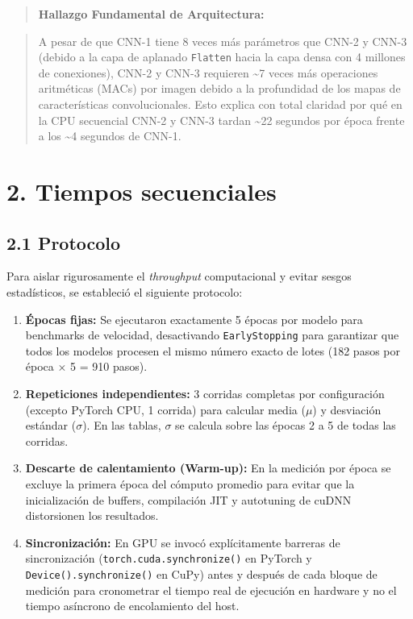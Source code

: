 \documentclass[
  11pt,
]{article}
\providecommand{\tightlist}{%
  \setlength{\itemsep}{0pt}\setlength{\parskip}{0pt}}
\begin{document}
\begin{quote}
\textbf{Hallazgo Fundamental de Arquitectura:}
\end{quote}

\begin{quote}
A pesar de que CNN-1 tiene 8 veces más parámetros
que CNN-2 y CNN-3 (debido a la capa de aplanado
\texttt{Flatten} hacia la capa densa con 4 millones de
conexiones), CNN-2 y CNN-3 requieren
\textasciitilde7 veces más operaciones aritméticas (MACs)
por imagen debido a la profundidad de los mapas de
características convolucionales. Esto explica con total
claridad por qué en la CPU secuencial CNN-2 y CNN-3 tardan
\textasciitilde22 segundos por época frente a los
\textasciitilde4 segundos de CNN-1.
\end{quote}

\clearpage
\section{2. Tiempos secuenciales}\label{mediciuxf3n-del-tiempo-secuencial-paso-2}

\subsection{2.1 Protocolo}\label{protocolo-experimental-de-mediciuxf3n}

Para aislar rigurosamente el \emph{throughput} computacional
y evitar sesgos estadísticos, se estableció el siguiente
protocolo:

\begin{enumerate}
\def\labelenumi{\arabic{enumi}.}
\tightlist
\item
  \textbf{Épocas fijas:} Se ejecutaron exactamente 5 épocas
  por modelo para benchmarks de velocidad, desactivando
  \texttt{EarlyStopping} para garantizar que todos los
  modelos procesen el mismo número exacto de lotes (182
  pasos por época \(\times\) 5 = 910 pasos).
\item
  \textbf{Repeticiones independientes:} 3 corridas completas
  por configuración (excepto PyTorch CPU, 1 corrida) para
  calcular media (\(\mu\)) y desviación estándar
  (\(\sigma\)). En las tablas, \(\sigma\) se calcula sobre
  las épocas 2 a 5 de todas las corridas.
\item
  \textbf{Descarte de calentamiento (Warm-up):} En la
  medición por época se excluye la primera época del cómputo
  promedio para evitar que la inicialización de buffers,
  compilación JIT y autotuning de cuDNN distorsionen los
  resultados.
\item
  \textbf{Sincronización:} En GPU se invocó explícitamente
  barreras de sincronización
  (\texttt{torch.cuda.synchronize()} en PyTorch y
  \texttt{Device().synchronize()} en CuPy) antes y después
  de cada bloque de medición para cronometrar el tiempo real
  de ejecución en hardware y no el tiempo asíncrono de
  encolamiento del host.
\end{enumerate}
\end{document}
